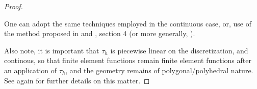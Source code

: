 \documentclass[english,a4paper,9pt,oneside]{scrbook}	%
\theoremstyle{break}
\newenvironment{mproof}[1][\proofname]{%
  \begin{proof}[#1]$ $\par\nobreak\ignorespaces
}{%
  \end{proof}
}
\renewcommand*{\proofname}{Proof}
\theoremstyle{remark}
\newcommand{\tred}[1]{\textcolor{red}{#1}}
\begin{document}
\begin{mproof}[Proof]

One can adopt the same techniques employed in the continuous case, or, use of the method proposed in and \cite{lindemann2}, section 4 (or more generally, \cite{lindemann}).

%
%
%
%
%
%

Also note, it is important that $\tau_h$ is piecewise linear on the discretization, and continous, so that finite element functions remain finite element functions after an application of $\tau_h$, and the geometry remains of polygonal/polyhedral nature. See again \cite{lindemann2} for further details on this matter.
\end{mproof}
\end{document}
